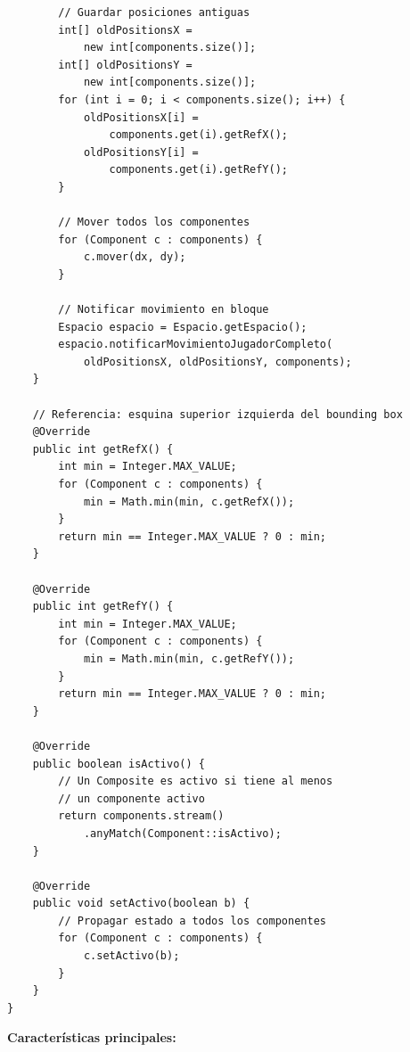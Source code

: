\documentclass[12pt]{article}
\begin{document}
\begin{lstlisting}
        // Guardar posiciones antiguas
        int[] oldPositionsX = 
            new int[components.size()];
        int[] oldPositionsY = 
            new int[components.size()];
        for (int i = 0; i < components.size(); i++) {
            oldPositionsX[i] = 
                components.get(i).getRefX();
            oldPositionsY[i] = 
                components.get(i).getRefY();
        }
        
        // Mover todos los componentes
        for (Component c : components) {
            c.mover(dx, dy);
        }
        
        // Notificar movimiento en bloque
        Espacio espacio = Espacio.getEspacio();
        espacio.notificarMovimientoJugadorCompleto(
            oldPositionsX, oldPositionsY, components);
    }
    
    // Referencia: esquina superior izquierda del bounding box
    @Override
    public int getRefX() {
        int min = Integer.MAX_VALUE;
        for (Component c : components) {
            min = Math.min(min, c.getRefX());
        }
        return min == Integer.MAX_VALUE ? 0 : min;
    }
    
    @Override
    public int getRefY() {
        int min = Integer.MAX_VALUE;
        for (Component c : components) {
            min = Math.min(min, c.getRefY());
        }
        return min == Integer.MAX_VALUE ? 0 : min;
    }
    
    @Override
    public boolean isActivo() {
        // Un Composite es activo si tiene al menos 
        // un componente activo
        return components.stream()
            .anyMatch(Component::isActivo);
    }
    
    @Override
    public void setActivo(boolean b) {
        // Propagar estado a todos los componentes
        for (Component c : components) {
            c.setActivo(b);
        }
    }
}
\end{lstlisting}

\textbf{Características principales:}
\end{document}
